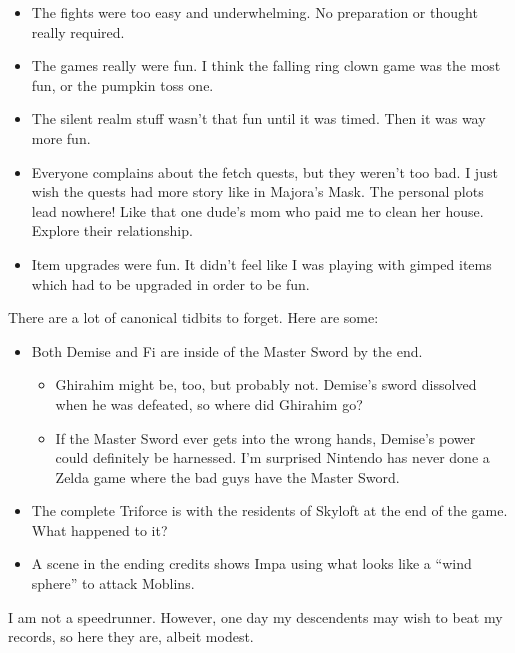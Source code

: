 
\newpage
{}

\begin{itemize}
	\item{The fights were too easy and underwhelming. No preparation or thought really required.}
 \item{The games really were fun. I think the falling ring clown game was the most fun,
	or the pumpkin toss one.}
 \item{The silent realm stuff wasn't that fun until it was timed. Then it was way more fun.}
 \item{Everyone complains about the fetch quests, but they weren't too bad. I just wish the 
	quests had more story like in Majora's Mask. The personal plots lead nowhere! Like
	that one dude's mom who paid me to clean her house. Explore their relationship.}
 \item{Item upgrades were fun. It didn't feel like I was playing with gimped items which
	had to be upgraded in order to be fun.}
\end{itemize}


\newpage
{}
There are a lot of canonical tidbits to forget. Here are some:
\begin{itemize}
	\item{Both Demise and Fi are inside of the Master Sword by the end.
		\begin{itemize}
			\item{Ghirahim might be, too, but probably not. Demise's sword dissolved when he was defeated, so where did Ghirahim go?}
			\item{If the Master Sword ever gets into the wrong hands, Demise's power could definitely be harnessed. I'm surprised Nintendo has never done a Zelda game where the bad guys have the Master Sword.}
		\end{itemize}
	}
	\item{The complete Triforce is with the residents of Skyloft at the end of the game. What happened to it?}
	\item{A scene in the ending credits shows Impa using what looks like a ``wind sphere'' to attack Moblins.}
\end{itemize}



\newpage
{}

I am not a speedrunner. However, one day my descendents may wish to beat my records, so here they are, albeit modest.

